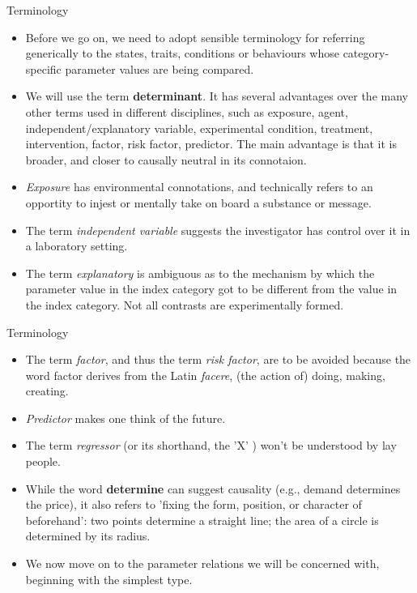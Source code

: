 \documentclass[10pt,handout]{beamer}\usepackage[]{graphicx}\usepackage[]{color}
\begin{document}
\begin{frame}{Terminology}
\begin{itemize}
	\item Before we go on, we need to adopt sensible terminology for referring generically to the states, traits, conditions or behaviours  whose category-specific parameter values are being compared. \pause 
	
	\item We will use the term  \textbf{determinant}. It has several advantages over the many other terms used in different disciplines, such as exposure, agent, independent/explanatory variable, experimental condition, treatment, intervention, factor, risk factor, predictor. The main advantage is that it is broader, and closer to causally neutral in its connotaion. \pause 
	
	\item  \textit{Exposure} has environmental connotations, and technically refers to an opportity to injest or mentally take on board a substance or message.  
	\pause 
	\item The term \textit{independent variable} suggests the investigator has control over it in a laboratory setting. 
	\pause 
	\item The term \textit{explanatory} is  ambiguous as to the mechanism by which the parameter value in the index category got to be different from the value in the index category. Not all contrasts are experimentally formed. 

\end{itemize}
\end{frame}


\begin{frame}{Terminology}
	\begin{itemize}
		\item The term \textit{factor}, and thus the term \textit{risk factor}, are to be avoided because the word factor derives from the Latin \textit{facere}, (the action of) doing, making, creating. 
		\pause 		
		\item \textit{Predictor} makes one think of the future. 
		
		\pause 
		\item The term \textit{regressor} (or its shorthand, the 'X' ) won't be understood by lay people.
		
				\pause 
		\item While the word \textbf{determine} can suggest causality (e.g., demand determines the price), it also refers to 'fixing the form, position, or character of beforehand': two points determine a straight line; the area of a circle is determined by its radius.
		
				\pause 
		\item We now move on to the parameter relations we will be concerned with, beginning with the simplest type.
	\end{itemize}
\end{frame}
\end{document}

